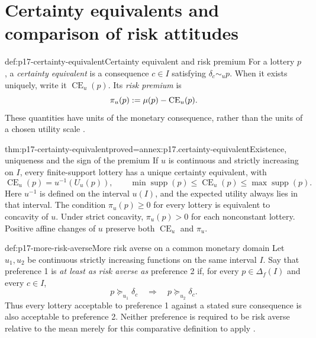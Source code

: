 \section{Certainty equivalents and comparison of risk attitudes}
\label{sec:p17-certainty-equivalents}

\begin{hbdefinition}{def:p17-certainty-equivalent}{Certainty equivalent and risk premium}
For a lottery \(p\), a \emph{certainty equivalent} is a consequence
\(c\in I\) satisfying \(\delta_c\sim_u p\). When it exists uniquely,
write it \(\operatorname{CE}_u(p)\). Its \emph{risk premium} is
\[
                \pi_u(p)\mathrel{:=}\mu(p)-\operatorname{CE}_u(p).
\]
These quantities have units of the monetary consequence, rather than
the units of a chosen utility scale
\cite[p.~111]{Rubinstein2015LectureNotes}.
\end{hbdefinition}

\begin{hbtheorem}{thm:p17-certainty-equivalent}{proved=annex:p17.certainty-equivalent}{Existence, uniqueness and the sign of the premium}
If \(u\) is continuous and strictly increasing on \(I\), every
finite-support lottery has a unique certainty equivalent, with
\[
 \operatorname{CE}_u(p)=u^{-1}(U_u(p)),\qquad
 \min\operatorname{supp}(p)\leq\operatorname{CE}_u(p)
                             \leq\max\operatorname{supp}(p).
\]
Here \(u^{-1}\) is defined on the interval \(u(I)\), and the
expected utility always lies in that interval. The condition
\(\pi_u(p)\geq0\) for every lottery is equivalent to concavity of \(u\). Under strict
concavity, \(\pi_u(p)>0\) for each nonconstant lottery. Positive
affine changes of \(u\) preserve both \(\operatorname{CE}_u\) and
\(\pi_u\).
\end{hbtheorem}

\begin{hbdefinition}{def:p17-more-risk-averse}{More risk averse on a common monetary domain}
Let \(u_1,u_2\) be continuous strictly increasing functions on the
same interval \(I\). Say that preference 1 is \emph{at least as risk
averse as} preference 2 if, for every \(p\in\Delta_f(I)\) and every
\(c\in I\),
\[
                  p\succeq_{u_1}\delta_c
                         \quad\Longrightarrow\quad
                  p\succeq_{u_2}\delta_c.
\]
Thus every lottery acceptable to preference 1 against a stated sure
consequence is also acceptable to preference 2. Neither preference is
required to be risk averse relative to the mean merely for this
comparative definition to apply
\cite[pp.~111--113]{Rubinstein2015LectureNotes}.
\end{hbdefinition}

